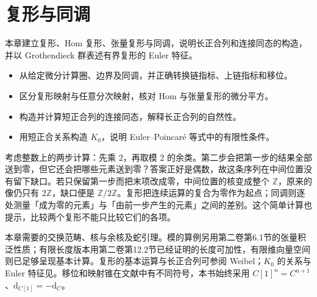 
\chapter{复形与同调}
\label{b4:ch:05}

\begin{chapterabstract}
	本章建立复形、Hom 复形、张量复形与同调，说明长正合列和连接同态的构造，并以 Grothendieck 群表述有界复形的 Euler 特征。
\end{chapterabstract}

\begin{learninggoals}
	\begin{itemize}
		\item 从给定微分计算圈、边界及同调，并正确转换链指标、上链指标和移位。
		\item 区分复形映射与任意分次映射，核对 Hom 与张量复形的微分平方。
		\item 构造并计算短正合列的连接同态，解释长正合列的自然性。
		\item 用短正合关系构造 \(K_0\)，说明 Euler–Poincaré 等式中的有限性条件。
	\end{itemize}
\end{learninggoals}

考虑整数上的两步计算：先乘 \(2\)，再取模 \(2\) 的余类。第二步会把第一步的结果全部送到零，但它还会把哪些元素送到零？答案正好是偶数，故这条序列在中间位置没有留下缺口。若只保留第一步而把末项改成零，中间位置的核变成整个 \(\mathbb Z\)，原来的像仍只有 \(2\mathbb Z\)，缺口便是 \(\mathbb Z/2\mathbb Z\)。复形把连续运算的复合为零作为起点；同调则逐处测量「成为零的元素」与「由前一步产生的元素」之间的差别。这个简单计算也提示，比较两个复形不能只比较它们的各项。

\ProseParagraphBreak
本章需要的交换范畴、核与余核及蛇引理。模的算例另用第二卷第6.1节的张量积泛性质；有限长度版本用第二卷第12.2节已经证明的长度可加性，有限维向量空间则已足够呈现基本计算。复形的基本运算与长正合列可参阅 Weibel\cite[Sections 1.1--1.3, Theorem 1.3.1, Addendum 1.3.3, Proposition 1.3.4]{Weibel1994HomologicalAlgebra}；\(K_0\) 的关系与 Euler 特征见\cite[Chapter II, Definition 6.1.1, Proposition 6.6]{Weibel2013KBook}。移位和映射锥在文献中有不同符号，本书始终采用 \(C[1]^n=C^{n+1}\)、\(\mathrm{d}_{C[1]}=-\mathrm{d}_C\)。






